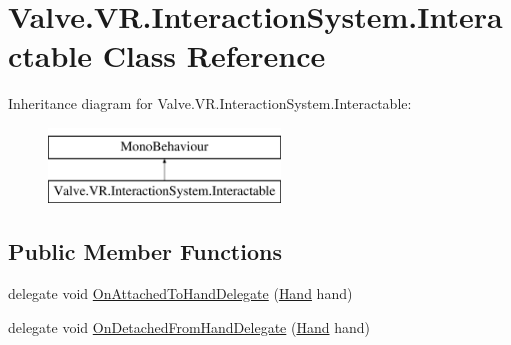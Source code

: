 \hypertarget{class_valve_1_1_v_r_1_1_interaction_system_1_1_interactable}{}\section{Valve.\+V\+R.\+Interaction\+System.\+Interactable Class Reference}
\label{class_valve_1_1_v_r_1_1_interaction_system_1_1_interactable}
Inheritance diagram for Valve.\+V\+R.\+Interaction\+System.\+Interactable\+:\begin{figure}[H]
\begin{center}
\leavevmode
\includegraphics[height=2.000000cm]{class_valve_1_1_v_r_1_1_interaction_system_1_1_interactable}
\end{center}
\end{figure}
\subsection*{Public Member Functions}
\begin{DoxyCompactItemize}
\item 
delegate void \mbox{\hyperlink{class_valve_1_1_v_r_1_1_interaction_system_1_1_interactable_a3ec0150eb5701a6782f6dc07c9ddd1a0}{On\+Attached\+To\+Hand\+Delegate}} (\mbox{\hyperlink{class_valve_1_1_v_r_1_1_interaction_system_1_1_hand}{Hand}} hand)
\item 
delegate void \mbox{\hyperlink{class_valve_1_1_v_r_1_1_interaction_system_1_1_interactable_abbbcb1950b93f7b9fcbbddc464b88d93}{On\+Detached\+From\+Hand\+Delegate}} (\mbox{\hyperlink{class_valve_1_1_v_r_1_1_interaction_system_1_1_hand}{Hand}} hand)
\end{DoxyCompactItemize}

